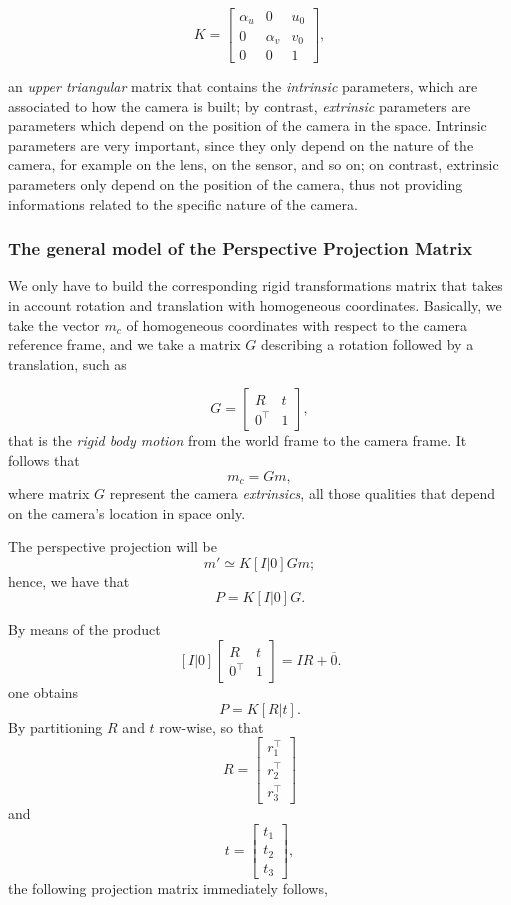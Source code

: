 \documentclass[10pt]{report}
\begin{document}
\[K = \begin{bmatrix} \alpha_u & 0 & u_0 \\ 0 & \alpha_v & v_0 \\ 0 & 0 & 1\end{bmatrix},\]

an \emph{upper triangular} matrix that contains the \emph{intrinsic} parameters, which are associated to how
the camera is built; by contrast, \emph{extrinsic} parameters are parameters
which depend on the position of the camera in the space. Intrinsic
parameters are very important, since they only depend on the nature of
the camera, for example on the lens, on the sensor, and so on; on contrast, extrinsic parameters only depend on the position of the camera, thus not providing informations related to the specific nature of the camera.

\subsubsection{The general model of the Perspective Projection Matrix}
\label{sec:org20ec679}
We only have to build the corresponding rigid transformations matrix
that takes in account rotation and translation with homogeneous
coordinates. Basically, we take the vector \(m_c\) of homogeneous
coordinates with respect to the camera reference frame, and we take a
matrix \(G\) describing a rotation followed by a translation, such as

\[G = \begin{bmatrix} R & t \\ 0^\top & 1 \end{bmatrix},\] that is the
\emph{rigid body motion} from the world frame to the camera frame. It follows
that \[m_c = Gm,\] where matrix \(G\) represent the camera \emph{extrinsics},
all those qualities that depend on the camera's location in space only.

The perspective projection will be \[ m' \simeq K[I|0]Gm;\] hence, we
have that \[P = K[I|0]G.\]

By means of the product
\[[I|0]\begin{bmatrix} R & t \\ 0^\top & 1 \end{bmatrix}= I R + \overline{0}.\]
one obtains \[P = K[R|t].\] By partitioning \(R\) and \(t\) row-wise, so
that
\[R = \begin{bmatrix} r_1^\top \\ r_2^\top \\ r_3^\top \end{bmatrix}\]
and \[t = \begin{bmatrix} t_1\\ t_2 \\ t_3\end{bmatrix},\] the following
projection matrix immediately follows,
\end{document}
